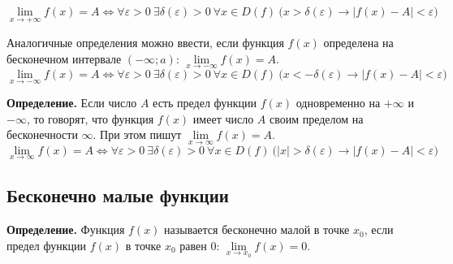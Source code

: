 \documentclass[a4paper,11pt]{article}
\begin{document}
\begin{center}
\end{center}

\[
  \lim_{x \to +\infty} f(x) = A \Leftrightarrow \forall \varepsilon > 0\ \exists \delta(\varepsilon) > 0\
  \forall x \in D(f)\ \bigl( x > \delta(\varepsilon) \rightarrow |f(x) - A| < \varepsilon \bigr)
\]

Аналогичные определения можно ввести, если функция $f(x)$ определена на бесконечном
интервале $(-\infty; a)$: $\lim\limits_{x \to -\infty} f(x) = A$.
\[
  \lim_{x \to -\infty} f(x) = A \Leftrightarrow \forall \varepsilon > 0\ \exists \delta(\varepsilon) > 0\
  \forall x \in D(f)\ \bigl( x < -\delta(\varepsilon) \rightarrow |f(x) - A| < \varepsilon \bigr)
\]

\begin{opr}
\textbf{Определение.}
  Если число $A$ есть предел функции $f(x)$ одновременно на $+\infty$ и $-\infty$, то говорят,
  что функция $f(x)$ имеет число $A$ своим пределом на бесконечности $\infty$. При этом пишут
  $\lim\limits_{x \to \infty} f(x) = A$.
  \[
    \lim_{x \to \infty} f(x) = A \Leftrightarrow \forall \varepsilon > 0\ \exists \delta(\varepsilon) > 0\
    \forall x \in D(f)\ \bigl( |x| > \delta(\varepsilon) \rightarrow |f(x) - A| < \varepsilon \bigr)
  \]
\end{opr}

\subsection{Бесконечно малые функции}

\begin{opr}
\textbf{Определение.}
  Функция $f(x)$ называется бесконечно малой в точке $x_0$, если предел функции $f(x)$
  в точке $x_0$ равен $0$: $\lim\limits_{x \to x_0} f(x) = 0$.
\end{opr}
\end{document}
